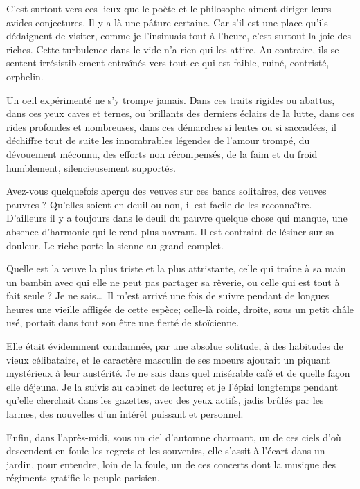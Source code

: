 C’est surtout vers ces lieux que le poète et le
philosophe aiment diriger leurs avides conjectures. Il y a là une
pâture certaine. Car s’il est une place
qu’ils dédaignent de visiter, comme je
l’insinuais tout à l’heure,
c’est surtout la joie des riches. Cette turbulence
dans le vide n’a rien qui les attire. Au contraire,
ils se sentent irrésistiblement entraînés vers tout ce qui est faible,
ruiné, contristé, orphelin.

Un oeil expérimenté ne s’y trompe jamais. Dans ces
traits rigides ou abattus, dans ces yeux caves et ternes, ou brillants
des derniers éclairs de la lutte, dans ces rides profondes et
nombreuses, dans ces démarches si lentes ou si saccadées, il déchiffre
tout de suite les innombrables légendes de l’amour
trompé, du dévouement méconnu, des efforts non récompensés, de la faim
et du froid humblement, silencieusement supportés.

Avez{}-vous quelquefois aperçu des veuves sur ces bancs solitaires, des
veuves pauvres ? Qu’elles soient en deuil ou non, il
est facile de les reconnaître. D’ailleurs il y a
toujours dans le deuil du pauvre quelque chose qui manque, une absence
d’harmonie qui le rend plus navrant. Il est contraint
de lésiner sur sa douleur. Le riche porte la sienne au grand complet.

Quelle est la veuve la plus triste et la plus attristante, celle qui
traîne à sa main un bambin avec qui elle ne peut pas partager sa
rêverie, ou celle qui est tout à fait seule ? Je ne sais\ldots\ Il
m’est arrivé une fois de suivre pendant de longues
heures une vieille affligée de cette espèce; celle{}-là roide, droite,
sous un petit châle usé, portait dans tout son être une fierté de
stoïcienne.

Elle était évidemment condamnée, par une absolue solitude, à des
habitudes de vieux célibataire, et le caractère masculin de ses moeurs
ajoutait un piquant mystérieux à leur austérité. Je ne sais dans quel
misérable café et de quelle façon elle déjeuna. Je la suivis au cabinet
de lecture; et je l’épiai longtemps pendant
qu’elle cherchait dans les gazettes, avec des yeux
actifs, jadis brûlés par les larmes, des nouvelles
d’un intérêt puissant et personnel.

Enfin, dans l’après{}-midi, sous un ciel
d’automne charmant, un de ces ciels
d’où descendent en foule les regrets et les souvenirs,
elle s’assit à l’écart dans un
jardin, pour entendre, loin de la foule, un de ces concerts dont la
musique des régiments gratifie le peuple parisien.

